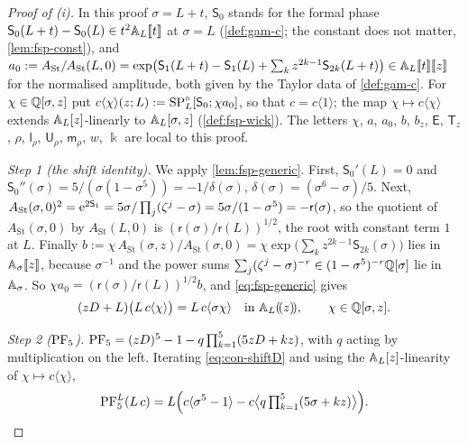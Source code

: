 \begin{proof}[Proof of (i)]
In this proof $\sigma=L+t$, $\mathsf S_0$ stands for the formal phase $\mathsf S_0(L+t)-\mathsf S_0(L)\in t^2\mathbb{A}_{L}[\![ t ]\!]$ at $\sigma=L$ (\cref{def:gam-c}; the constant does not matter, \cref{lem:fsp-const}), and $a_0:=A_{\mathrm{St}}/A_{\mathrm{St}}(L,0)=\exp\bigl(\mathsf S_1(L+t)-\mathsf S_1(L)+\sum_kz^{2k-1}\mathsf S_{2k}(L+t)\bigr)\in\mathbb{A}_{L}[\![ t ]\!][\![ z ]\!]$ for the normalised amplitude, both given by the Taylor data of \cref{def:gam-c}. For $\chi\in\mathbb{Q}[\sigma,z]$ put $c\langle\chi\rangle(z;L):=\mathrm{SP}^{\circ}_L[\mathsf S_0;\chi a_0]$, so that $c=c\langle1\rangle$; the map $\chi\mapsto c\langle\chi\rangle$ extends $\mathbb{A}_{L}[z]$-linearly to $\mathbb{A}_{L}[\sigma,z]$ (\cref{def:fsp-wick}). The letters $\chi$, $a$, $a_0$, $b$, $b_z$, $\mathsf E$, $\mathsf T_z$, $\rho$, $\mathsf l_\rho$, $\mathsf U_\rho$, $\mathsf m_\rho$, $w$, $\Bbbk$ are local to this proof.

\emph{Step 1 (the shift identity).} We apply \cref{lem:fsp-generic}. First, $\mathsf S_0'(L)=0$ and $\mathsf S_0''(\sigma)=5/(\sigma(1-\sigma^5))=-1/\delta(\sigma)$, $\delta(\sigma)=(\sigma^6-\sigma)/5$. Next, $A_{\mathrm{St}}(\sigma,0)^2=\mathrm{e}^{2\mathsf S_1}=5\sigma/\prod_j(\zeta^j-\sigma)=5\sigma/(1-\sigma^5)=-\mathsf r(\sigma)$, so the quotient of $A_{\mathrm{St}}(\sigma,0)$ by $A_{\mathrm{St}}(L,0)$ is $(\mathsf r(\sigma)/\mathsf r(L))^{1/2}$, the root with constant term $1$ at $L$. Finally $b:=\chi\,A_{\mathrm{St}}(\sigma,z)/A_{\mathrm{St}}(\sigma,0)=\chi\exp\bigl(\sum_kz^{2k-1}\mathsf S_{2k}(\sigma)\bigr)$ lies in $\mathbb{A}_\sigma[\![ z ]\!]$, because $\sigma^{-1}$ and the power sums $\sum_j(\zeta^j-\sigma)^{-r}\in(1-\sigma^5)^{-r}\mathbb{Q}[\sigma]$ lie in $\mathbb{A}_\sigma$. So $\chi a_0=(\mathsf r(\sigma)/\mathsf r(L))^{1/2}b$, and \eqref{eq:fsp-generic} gives
\begin{equation}
\label{eq:con-shiftD}
(zD+L)\bigl(L\,c\langle\chi\rangle\bigr)=L\,c\langle\sigma\chi\rangle\quad\text{in }\mathbb{A}_{L}(\!(z)\!),\qquad\chi\in\mathbb{Q}[\sigma,z].
\end{equation}

\emph{Step 2 ($\mathrm{PF}_{5}$).} $\mathrm{PF}_{5}=(zD)^5-1-q\prod_{k=1}^5(5zD+kz)$, with $q$ acting by multiplication on the left. Iterating \eqref{eq:con-shiftD} and using the $\mathbb{A}_{L}[z]$-linearity of $\chi\mapsto c\langle\chi\rangle$,
\[
\mathrm{PF}_{5}^{L}(L\,c)=L\Bigl(c\langle\sigma^5-1\rangle-c\bigl\langle q\textstyle\prod_{k=1}^5(5\sigma+kz)\bigr\rangle\Bigr).
\]


\end{proof}
